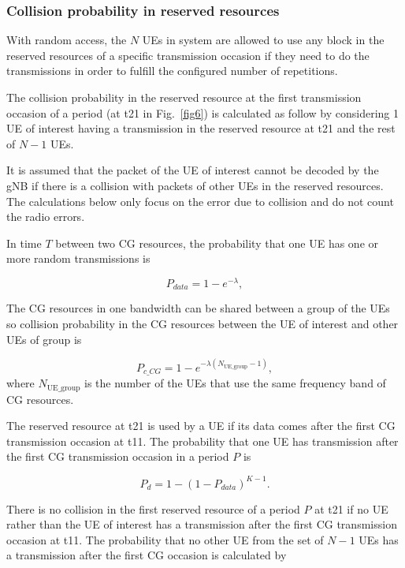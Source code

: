 \documentclass{ieeeaccess}
\begin{document}
\subsubsection{Collision probability in reserved resources}\label{IIIB3}

With random access, the $N$ UEs in system are allowed to use any block in the reserved resources of a specific transmission occasion if they need to do the transmissions in order to fulfill the configured number of repetitions.

The collision probability in the reserved resource at the first transmission occasion of a period (at t21 in Fig.~\ref{fig6}) is calculated as follow by considering 1 UE of interest having a transmission in the reserved resource at t21 and the rest of $N-1$ UEs.

It is assumed that the packet of the UE of interest cannot be decoded by the gNB if there is a collision with packets of other UEs in the reserved resources. The calculations below only focus on the error due to collision and do not count the radio errors.

In time $T$ between two CG resources, the probability that one UE has one or more random transmissions is

\begin{equation}
P_{data} = 1 - e^{-\lambda},\label{eq1}
\end{equation}

The CG resources in one bandwidth can be shared between a group of the UEs so collision probability in the CG resources between the UE of interest and other UEs of group is 

\begin{equation}
P_{c\_CG} = 1 - e^{-\lambda(N_\mathrm{UE\_group}-1)},\label{eq2}
\end{equation}
where $N_\mathrm{UE\_group}$ is the number of the UEs that use the same frequency band of CG resources.

The reserved resource at t21 is used by a UE if its data comes after the first CG transmission occasion at t11. The probability that one UE has transmission after the first CG transmission occasion in a period $P$ is 

\begin{equation}
P_{d} = 1 - (1-P_{data})^{K-1}.\label{eq3}
\end{equation}

There is no collision in the first reserved resource of a period $P$ at t21 if no UE rather than the UE of interest has a transmission after the first CG transmission occasion at t11. The probability that no other UE from the set of $N-1$ UEs has a transmission after the first CG occasion is calculated by 
\end{document}
